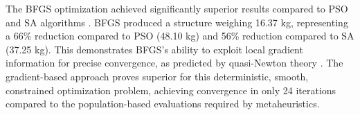 The BFGS optimization achieved significantly superior results compared to PSO and SA algorithms \cite{task3report}. BFGS produced a structure weighing 16.37 kg, representing a 66\% reduction compared to PSO (48.10 kg) and 56\% reduction compared to SA (37.25 kg). This demonstrates BFGS's ability to exploit local gradient information for precise convergence, as predicted by quasi-Newton theory \cite[Chapter 8]{nocedalwright2006}. The gradient-based approach proves superior for this deterministic, smooth, constrained optimization problem, achieving convergence in only 24 iterations compared to the population-based evaluations required by metaheuristics.